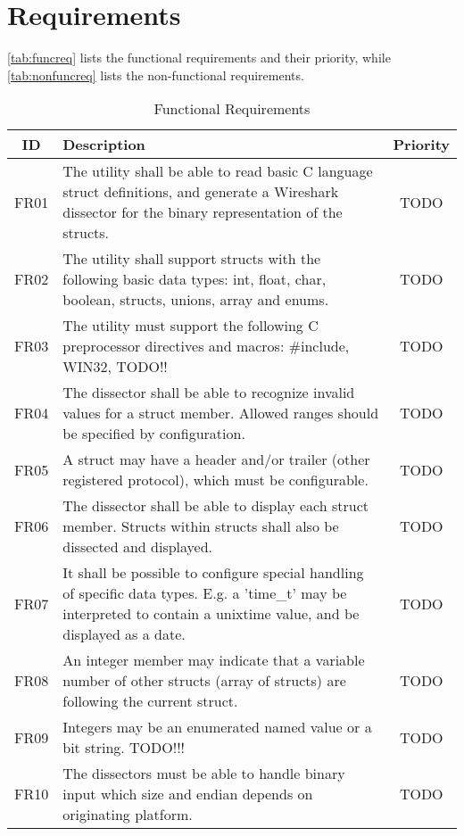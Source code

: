 \chapter{Requirements}
\autoref{tab:funcreq} lists the functional requirements and their priority,
while \autoref{tab:nonfuncreq} lists the non-functional requirements.

\begin{table}[h] \center
\caption{Functional Requirements\label{tab:funcreq}}
\begin{tabular}{| c | p{9cm} | c |}
	\hline ID & Description & Priority \\
    \hline FR01 & The utility shall be able to read basic C language struct
		definitions, and generate a Wireshark dissector for the binary
		representation of the structs. & TODO \\
	\hline FR02 & The utility shall support structs with the following basic
		data types: int, float, char, boolean, structs, unions, array and
		enums. & TODO \\
	\hline FR03 & The utility must support the following C preprocessor
		directives and macros: \#include, WIN32, TODO!! & TODO \\
	\hline FR04 & The dissector shall be able to recognize invalid values for
		a struct member. Allowed ranges should be specified by configuration.
		& TODO \\
	\hline FR05 & A struct may have a header and/or trailer (other registered
		protocol), which must be configurable. & TODO \\
	\hline FR06 & The dissector shall be able to display each struct member.
		Structs within structs shall also be dissected and displayed. & TODO \\
	\hline FR07 & It shall be possible to configure special handling of
		specific data types. E.g. a 'time\_t' may be interpreted to contain a
		unixtime value, and be displayed as a date. & TODO \\
	\hline FR08 & An integer member may indicate that a variable number of
		other structs (array of structs) are following the current struct.
		& TODO \\
	\hline FR09 & Integers may be an enumerated named value or a bit string.
		TODO!!!
		& TODO \\
	\hline FR10 & The dissectors must be able to handle binary input which size
		and endian depends on originating platform. & TODO \\
	\hline
\end{tabular}
\end{table}

